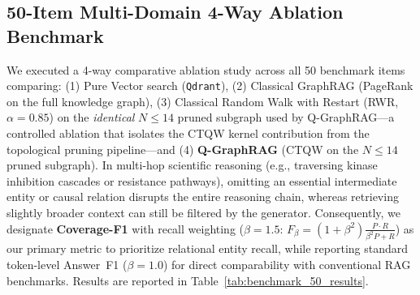 \documentclass{llncs}
\begin{document}
\subsection{50-Item Multi-Domain 4-Way Ablation Benchmark}
We executed a 4-way comparative ablation study across all 50 benchmark items comparing: (1) Pure Vector search (\texttt{Qdrant}), (2) Classical GraphRAG (PageRank on the full knowledge graph), (3) Classical Random Walk with Restart (RWR, $\alpha=0.85$) on the \emph{identical} $N\leq14$ pruned subgraph used by Q-GraphRAG---a controlled ablation that isolates the CTQW kernel contribution from the topological pruning pipeline---and (4) \textbf{Q-GraphRAG} (CTQW on the $N\leq14$ pruned subgraph). In multi-hop scientific reasoning (e.g., traversing kinase inhibition cascades or resistance pathways), omitting an essential intermediate entity or causal relation disrupts the entire reasoning chain, whereas retrieving slightly broader context can still be filtered by the generator. Consequently, we designate \textbf{Coverage-F1} with recall weighting ($\beta = 1.5$: $F_{\beta} = (1+\beta^2)\frac{P \cdot R}{\beta^2 P + R}$) as our primary metric to prioritize relational entity recall, while reporting standard token-level Answer~F1 ($\beta = 1.0$) for direct comparability with conventional RAG benchmarks. Results are reported in Table~\ref{tab:benchmark_50_results}.
\end{document}
